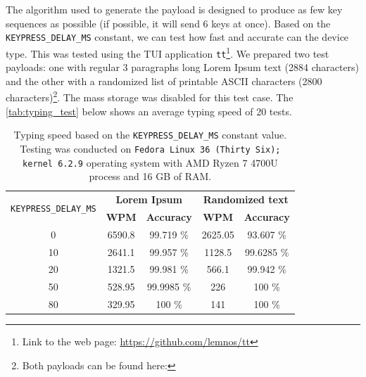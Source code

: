 The algorithm used to generate the payload is designed to produce as few key sequences as possible (if possible, it will send 6 keys at once). Based on the \verb|KEYPRESS_DELAY_MS| constant, we can test how fast and accurate can the device type. This was tested using the TUI application \verb|tt|\footnote{Link to the web page: \url{https://github.com/lemnos/tt}}. We prepared two test payloads: one with regular 3 paragraphs long Lorem Ipsum text (2884 characters) and the other with a randomized list of printable ASCII characters (2800 characters)\footnote{Both payloads can be found here: }. The mass storage was disabled for this test case. The \autoref{tab:typing_test} below shows an average typing speed of 20 tests.
\begin{table}[ht]
    \centering
    \begin{tabular}{|c|c|c|c|c|} \hline
        \multirow{2}{*}{\texttt{KEYPRESS\_DELAY\_MS}} & \multicolumn{2}{|c|}{\textbf{Lorem Ipsum}} & \multicolumn{2}{|c|}{\textbf{Randomized text}} \\ \cline{2-5}
                                                      & \textbf{WPM} &           \textbf{Accuracy} & \textbf{WPM} &               \textbf{Accuracy} \\ \hline
                                                    0 &       6590.8 &                   99.719 \% &      2625.05 &                      93.607 \%  \\ \hline
                                                   10 &       2641.1 &                   99.957 \% &       1128.5 &                     99.6285 \%  \\ \hline
                                                   20 &       1321.5 &                   99.981 \% &        566.1 &                      99.942 \%  \\ \hline
                                                   50 &       528.95 &                  99.9985 \% &          226 &                         100 \%  \\ \hline
                                                   80 &       329.95 &                      100 \% &          141 &                         100 \%  \\ \hline
    \end{tabular}
    \caption{Typing speed based on the \texttt{KEYPRESS\_DELAY\_MS} constant value. Testing was conducted on \texttt{Fedora Linux 36 (Thirty Six); kernel 6.2.9} operating system with AMD Ryzen 7 4700U process and 16 GB of RAM.}
    \label{tab:typing_test}
\end{table}
